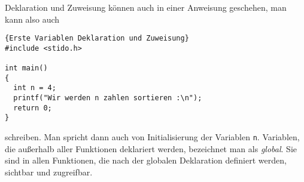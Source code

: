 Deklaration und Zuweisung können auch in einer Anweisung geschehen, man kann also auch
\begin{lstlisting}{Erste Variablen Deklaration und Zuweisung}
#include <stido.h>

int main()
{
  int n = 4;
  printf("Wir werden n zahlen sortieren :\n");
  return 0;
}
\end{lstlisting}
schreiben. 
Man spricht dann auch von Initialisierung der Variablen \texttt{n}.
Variablen, die außerhalb aller Funktionen deklariert werden, bezeichnet man als \emph{global}.
Sie sind in allen Funktionen, die nach der globalen Deklaration definiert werden, sichtbar und zugreifbar.

%
